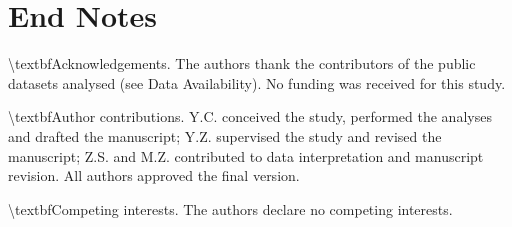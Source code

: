 \documentclass[11pt]{article}
\begin{document}
\section*{End Notes}
\textbackslash{}textbf{Acknowledgements.} The authors thank the contributors of the public datasets analysed (see Data Availability). No funding was received for this study.

\textbackslash{}textbf{Author contributions.} Y.C. conceived the study, performed the analyses and drafted the manuscript; Y.Z. supervised the study and revised the manuscript; Z.S. and M.Z. contributed to data interpretation and manuscript revision. All authors approved the final version.

\textbackslash{}textbf{Competing interests.} The authors declare no competing interests.
\end{document}
